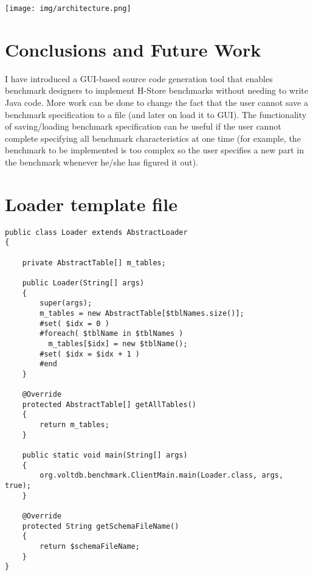 \documentclass[a4paper,10pt]{article}
\newcommand{\system} {Source Code Generation Tool for H-Store OLTP Benchmark }
\begin{document}
\begin{figure*}
\texttt{[image: img/architecture.png]}
\caption{Archiecture of \system}
\label{architecture}
\end{figure*}

\section{Conclusions and Future Work}
\label{secFuture}
I have introduced a GUI-based source code generation tool that enables benchmark designers to implement H-Store benchmarks without needing to write Java code. More work can be done to change the fact that the user cannot save a benchmark specification to a file (and later on load it to GUI). The functionality of saving/loading benchmark specification can be useful if the user cannot complete specifying all benchmark characteristics at one time (for example, the benchmark to be implemented is too complex so the user specifies a new part in the benchmark whenever he/she has figured it out).




\newpage
\appendix

\section{Loader template file}
\begin{verbatim}
public class Loader extends AbstractLoader 
{

    private AbstractTable[] m_tables;

    public Loader(String[] args) 
    {
        super(args);
        m_tables = new AbstractTable[$tblNames.size()];
        #set( $idx = 0 )
        #foreach( $tblName in $tblNames )
          m_tables[$idx] = new $tblName();
        #set( $idx = $idx + 1 )
        #end
    }

    @Override
    protected AbstractTable[] getAllTables()
    {
        return m_tables;
    }

    public static void main(String[] args) 
    {
        org.voltdb.benchmark.ClientMain.main(Loader.class, args, true);
    }

    @Override
    protected String getSchemaFileName()
    {
        return $schemaFileName;
    }
}
\end{verbatim}
\end{document}
